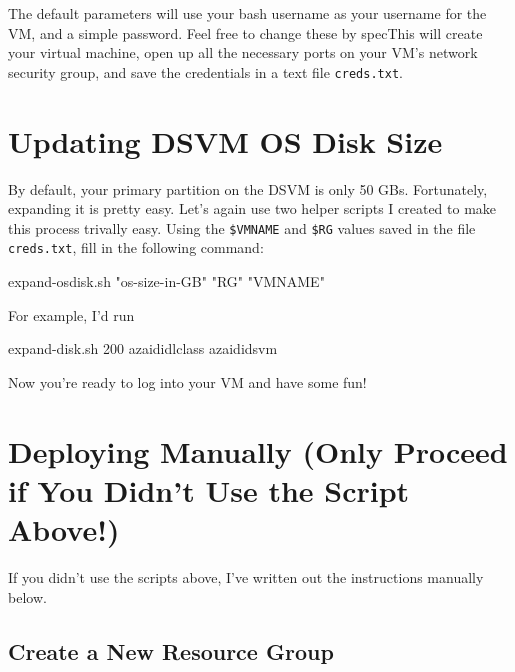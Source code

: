 \documentclass[]{book}
\newenvironment{Shaded}{\begin{snugshade}}{\end{snugshade}}
\newcommand{\StringTok}[1]{\textcolor[rgb]{0.31,0.60,0.02}{#1}}
\newcommand{\ExtensionTok}[1]{#1}
\newcommand{\NormalTok}[1]{#1}
\theoremstyle{definition}
\theoremstyle{definition}
\theoremstyle{definition}
\theoremstyle{remark}
\begin{document}
The default parameters will use your bash username as your username for
the VM, and a simple password. Feel free to change these by specThis
will create your virtual machine, open up all the necessary ports on
your VM's network security group, and save the credentials in a text
file \texttt{creds.txt}.

\section{Updating DSVM OS Disk Size}\label{updating-dsvm-os-disk-size}

By default, your primary partition on the DSVM is only 50 GBs.
Fortunately, expanding it is pretty easy. Let's again use two helper
scripts I created to make this process trivally easy. Using the
\texttt{\$VMNAME} and \texttt{\$RG} values saved in the file
\texttt{creds.txt}, fill in the following command:

\begin{Shaded}
\begin{Highlighting}[]
\ExtensionTok{expand-osdisk.sh} \StringTok{"os-size-in-GB"} \StringTok{"RG"} \StringTok{"VMNAME"}
\end{Highlighting}
\end{Shaded}

For example, I'd run

\begin{Shaded}
\begin{Highlighting}[]
\ExtensionTok{expand-disk.sh}\NormalTok{ 200 azaididlclass azaididsvm}
\end{Highlighting}
\end{Shaded}

Now you're ready to log into your VM and have some fun!

\section{\texorpdfstring{Deploying Manually \textbf{(Only Proceed if You
Didn't Use the Script
Above!)}}{Deploying Manually (Only Proceed if You Didn't Use the Script Above!)}}\label{deploying-manually-only-proceed-if-you-didnt-use-the-script-above}

If you didn't use the scripts above, I've written out the instructions
manually below.

\subsection{Create a New Resource
Group}\label{create-a-new-resource-group}
\end{document}
